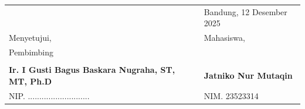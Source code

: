\documentclass[a4paper,11pt]{article}
\begin{document}
\vspace{1.5cm}

\begin{table}[h!]
    \centering
    \begin{tabular}{p{7cm} p{7cm}}
        & Bandung, 12 Desember 2025 \\
        Menyetujui, & Mahasiswa, \\
        Pembimbing & \\
        \vspace{2.5cm} & \vspace{2.5cm} \\
        \textbf{Ir. I Gusti Bagus Baskara Nugraha, ST, MT, Ph.D} & \textbf{Jatniko Nur Mutaqin} \\
        NIP. ........................... & NIM. 23523314
    \end{tabular}
\end{table}
\end{document}
